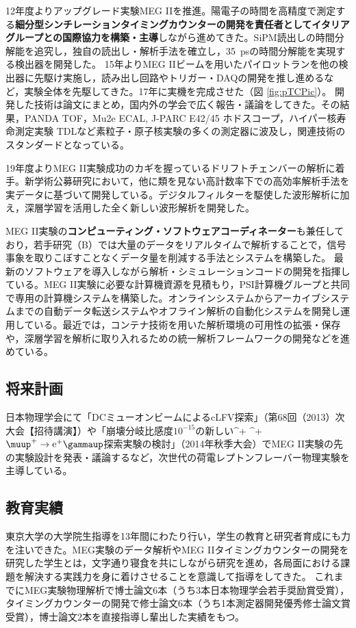 \documentclass[11pt,a4paper,uplatex,dvipdfmx]{ujarticle} 		%
\newcommand{\研究課題名}{象の卵}
\newcommand{\研究機関名}{東京大学}
\newcommand{\研究代表者氏名}{内山雄祐}
\newcommand{\研究期間の最終元号年度}{6}  %
\renewcommand{\emph}[1]{{\sffamily\bfseries{#1}}}
\newcommand*{\megc}{\ifmmode\muup^+ \to \mathrm{e}^+ \gammaup\else$\muup^+ \to \mathrm{e}^+ \gammaup$\fi}
\begin{document}
12年度よりアップグレード実験MEG IIを推進\cite{upgrade_proposal}。陽電子の時間を高精度で測定する\emph{細分型シンチレーションタイミングカウンターの開発を責任者としてイタリアグループとの国際協力を構築・主導}しながら進めてきた。SiPM読出しの時間分解能を追究し，独自の読出し・解析手法を確立し\cite{tc-single}，35~psの時間分解能を実現する検出器を開発した\cite{laser, vci2016}。
15年よりMEG IIビームを用いたパイロットランを他の検出器に先駆け実施し，読み出し回路やトリガー・DAQの開発を推し進めるなど，実験全体を先駆してきた。17年に実機を完成させた\cite{vci2019}（図 \ref{fig:pTCPic}）。
開発した技術は論文にまとめ\cite{radiation, laser, btf2014, tc-single}，国内外の学会で広く報告・議論をしてきた。その結果，PANDA TOF，Mu2e ECAL, J-PARC E42/45 ホドスコープ，ハイパー核寿命測定実験 TDLなど素粒子・原子核実験の多くの測定器に波及し，関連技術のスタンダードとなっている。

19年度よりMEG II実験成功のカギを握っているドリフトチェンバーの解析に着手。新学術公募研究において，他に類を見ない高計数率下での高効率解析手法を実データに基づいて開発している。デジタルフィルターを駆使した波形解析に加え，深層学習を活用した全く新しい波形解析を開発した。

MEG II実験の\emph{コンピューティング・ソフトウェアコーディネーター}も兼任しており，若手研究（B）では大量のデータをリアルタイムで解析することで，信号事象を取りこぼすことなくデータ量を削減する手法とシステムを構築した。
最新のソフトウェアを導入しながら解析・シミュレーションコードの開発を指揮している。MEG II実験に必要な計算機資源を見積もり，PSI計算機グループと共同で専用の計算機システムを構築した。オンラインシステムからアーカイブシステムまでの自動データ転送システムやオフライン解析の自動化システムを開発し運用している。最近では，コンテナ技術を用いた解析環境の可用性の拡張・保存や，深層学習を解析に取り入れるための統一解析フレームワークの開発などを進めている。

\subsection{将来計画}
日本物理学会にて「DCミューオンビームによるcLFV探索」（第68回（2013）次大会【招待講演】）や「崩壊分岐比感度$10^{-15}$の新しい\megc 探索実験の検討」（2014年秋季大会）でMEG II実験の先の実験設計を発表・議論するなど，次世代の荷電レプトンフレーバー物理実験を主導している\cite{himb}。



\subsection{教育実績}
東京大学の大学院生指導を13年間にわたり行い，学生の教育と研究者育成にも力を注いできた。MEG実験のデータ解析やMEG IIタイミングカウンターの開発を研究した学生とは，文字通り寝食を共にしながら研究を進め，各局面における課題を解決する実践力を身に着けさせることを意識して指導をしてきた。%
これまでにMEG実験物理解析で博士論文6本（うち3本日本物理学会若手奨励賞受賞），タイミングカウンターの開発で修士論文6本（うち1本測定器開発優秀修士論文賞受賞），博士論文2本を直接指導し輩出した実績をもつ。
\end{document}
